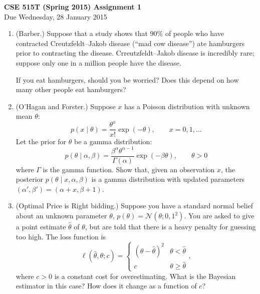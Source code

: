 \documentclass{article}
\newcommand{\given}{\mid}
\newcommand{\mc}[1]{\mathcal{#1}}
\begin{document}
{\large \textbf{CSE 515T (Spring 2015) Assignment 1}} \\
Due Wednesday, 28 January 2015 \\

\begin{enumerate}

\item
  (Barber.)
  Suppose that a study shows that 90\% of people who have contracted
  Creutzfeldt--Jakob disease (``mad cow disease'') ate hamburgers
  prior to contracting the disease.  Crreutzfeldt--Jakob disease is
  incredibly rare; suppose only one in a million people have the
  disease.

  If you eat hamburgers, should you be worried?  Does this depend on
  how many other people eat hamburgers?

\item
  (O'Hagan and Forster.)
  Suppose $x$ has a Poisson distribution with unknown mean
  $\theta$:
  \begin{equation*}
    p(x \given \theta) = \frac{\theta^x}{x!} \exp(-\theta),
    \qquad
    x = 0, 1, \dotsc
  \end{equation*}
  Let the prior for $\theta$ be a gamma distribution:
  \begin{equation*}
    p(\theta \given \alpha, \beta)
    =
    \frac{\beta^\alpha \theta^{\alpha - 1}}{\Gamma(\alpha)} \exp(-\beta\theta),
    \qquad \theta > 0
  \end{equation*}
  where $\Gamma$ is the gamma function.  Show that, given an
  observation $x$, the posterior $p(\theta \given x, \alpha, \beta)$
  is a gamma distribution with updated parameters $(\alpha', \beta') =
  (\alpha + x, \beta + 1)$.

\item
  (Optimal Price is Right bidding.)
  Suppose you have a standard normal belief about an unknown parameter
  $\theta$, $p(\theta) = \mc{N}(\theta; 0, 1^2)$.  You are asked to
  give a point estimate $\hat{\theta}$ of $\theta$, but are told that
  there is a heavy penalty for guessing too high.  The loss function is
  \begin{equation*}
    \ell(\hat{\theta}, \theta; c)
    =
    \begin{cases}
      (\theta - \hat{\theta})^2 & \theta  <   \hat{\theta} \\
      c                         & \theta \geq \hat{\theta}
    \end{cases},
  \end{equation*}
  where $c > 0$ is a constant cost for overestimating.  What is the
  Bayesian estimator in this case?  How does it change as a function
  of $c$?


\end{enumerate}
\end{document}
